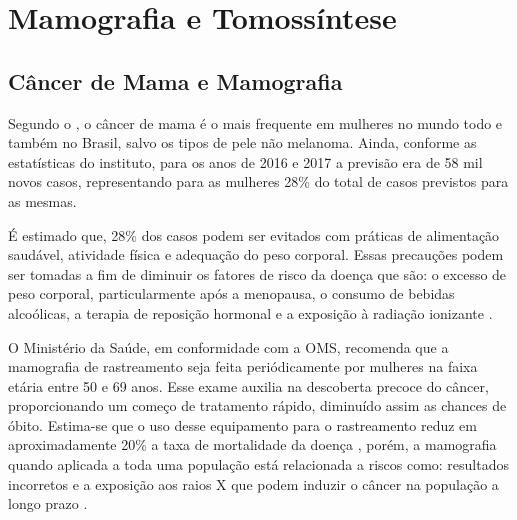 \chapter[Mamografia e Tomossíntese]{Mamografia e Tomossíntese}\label{Capitulo2}

\section{Câncer de Mama e Mamografia}

Segundo o , o câncer de mama é o mais frequente em mulheres no mundo todo e também no Brasil, salvo os tipos de pele não melanoma. Ainda, conforme as estatísticas do instituto, para os anos de 2016 e 2017 a previsão era de 58 mil novos casos, representando para as mulheres 28\% do total de casos previstos para as mesmas. 

É estimado que, 28\% dos casos podem ser evitados com práticas de alimentação saudável, atividade física  e adequação do peso corporal. Essas precauções podem ser tomadas a fim de diminuir os fatores de risco da doença que são: o excesso de peso corporal, particularmente após a menopausa, o consumo de bebidas alcoólicas, a terapia de reposição hormonal e a exposição à radiação ionizante \cite{inca}.

O Ministério da Saúde, em conformidade com a \ac{OMS}, recomenda que a mamografia de rastreamento seja feita periódicamente por mulheres na faixa etária entre 50 e 69 anos. Esse exame auxilia na descoberta precoce do câncer, proporcionando um começo de tratamento rápido, diminuído assim as chances de óbito. Estima-se que o uso desse equipamento para o rastreamento reduz em aproximadamente 20\% a taxa de mortalidade da doença \cite{oms}, porém, a mamografia quando aplicada a toda uma população está relacionada a riscos como: resultados incorretos e a exposição aos raios X que podem induzir o câncer na população a longo prazo \cite{yaffe2011risk,inca}. 


